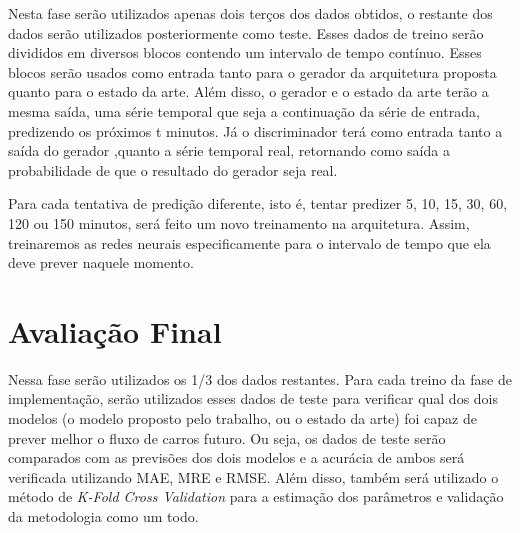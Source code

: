 Nesta fase serão utilizados apenas dois terços dos dados obtidos, o restante dos dados serão utilizados posteriormente como teste. Esses dados de treino serão divididos em diversos blocos contendo um intervalo de tempo contínuo. Esses blocos serão usados como entrada tanto para o gerador da arquitetura proposta quanto para o estado da arte. Além disso, o gerador e o estado da arte terão a mesma saída, uma série temporal que seja a continuação da série de entrada, predizendo os próximos t minutos. Já o discriminador terá como entrada tanto a saída do gerador ,quanto a série temporal real, retornando como saída a probabilidade de que o resultado do gerador seja real.

Para cada tentativa de predição diferente, isto é, tentar predizer 5, 10, 15, 30, 60, 120 ou 150 minutos, será feito um novo treinamento na arquitetura. Assim, treinaremos as redes neurais especificamente para o intervalo de tempo que ela deve prever naquele momento.

\section{Avaliação Final}

Nessa fase serão utilizados os 1/3 dos dados restantes. Para cada treino da fase de implementação, serão utilizados esses dados de teste para verificar qual dos dois modelos (o modelo proposto pelo trabalho, ou o estado da arte) foi capaz de prever melhor o fluxo de carros futuro. Ou seja, os dados de teste serão comparados com as previsões dos dois modelos e a acurácia de ambos será verificada utilizando \acrshort{MAE}, \acrshort{MRE} e \acrshort{RMSE}. Além disso, também será utilizado o método de \textit{K-Fold Cross Validation} para a estimação dos parâmetros e validação da metodologia como um todo.
